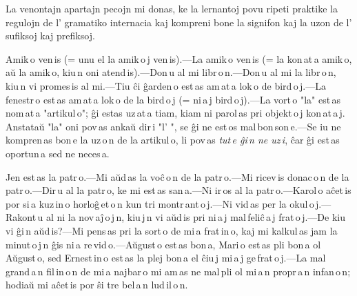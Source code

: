 \documentclass[ngerman,12pt,twoside]{book}
\begin{document}
La venontajn apartajn pecojn mi donas, ke la lernantoj povu ripeti praktike la regulojn de l' gramatiko internacia kaj kompreni bone la signifon kaj la uzon de l' sufiksoj kaj prefiksoj.



Amik\,o ven\,is (= unu el la amik\,o\,j ven\,is).---La amik\,o ven\,is (= la kon\,at\,a amik\,o, aŭ la amik\,o, kiu\,n oni atend\,is).---Don\,u al mi libr\,o\,n.---Don\,u al mi la libr\,o\,n, kiu\,n vi promes\,is al mi.---Tiu ĉi ĝarden\,o est\,as am\,at\,a lok\,o de bird\,o\,j.---La fenestr\,o est\,as am\,at\,a lok\,o de la bird\,o\,j (= ni\,a\,j bird\,o\,j).---La vort\,o "la" est\,as nom\,at\,a "artikul\,o"; ĝi estas uz\,at\,a tiam, kiam ni parol\,as pri objekt\,o\,j kon\,at\,a\,j. Anstataŭ "la" oni pov\,as ankaŭ dir\,i "l' ", se ĝi ne est\,os mal\,bon\,son\,e.---Se iu ne kompren\,as bon\,e la uz\,o\,n de la artikul\,o, li pov\,as \emph{tut\,e ĝi\,n ne uz\,i}, ĉar ĝi est\,as oportun\,a sed ne neces\,a. 



Jen est\,as la patr\,o.---Mi aŭd\,as la voĉ\,o\,n de la patr\,o.---Mi ricev\,is donac\,o\,n de la patr\,o.---Dir\,u al la patr\,o, ke mi est\,as san\,a.---Ni ir\,os al la patr\,o.---Karol\,o aĉet\,is por si\,a kuz\,in\,o horloĝ\,et\,o\,n kun tri montr\,ant\,o\,j.---Ni vid\,as per la okul\,o\,j.---Rakont\,u al ni la nov\,aĵ\,o\,j\,n, kiu\,j\,n vi aŭd\,is pri ni\,a\,j mal\,feliĉ\,a\,j frat\,o\,j.---De kiu vi ĝi\,n aŭd\,is?---Mi pens\,as pri la sort\,o de mi\,a frat\,in\,o, kaj mi kalkul\,as jam la minut\,o\,j\,n ĝis ni\,a re\,vid\,o.---Aŭgust\,o est\,as bon\,a, Mari\,o est\,as pli bon\,a ol Aŭgust\,o, sed Ernest\,in\,o est\,as la plej bon\,a el ĉiu\,j mi\,a\,j ge\,frat\,o\,j.---La mal\,grand\,a\,n fil\,in\,o\,n de mi\,a najbar\,o mi am\,as ne mal\,pli ol mi\,a\,n propr\,a\,n infan\,o\,n; hodiaŭ mi aĉet\,is por ŝi tre bel\,a\,n lud\,il\,o\,n. 


\end{document}
